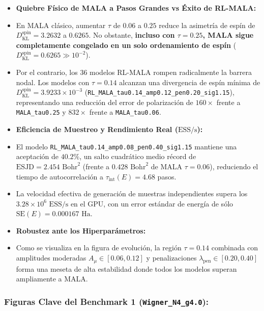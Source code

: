 \documentclass[10pt,a4paper]{article}
\begin{document}
\begin{itemize}
\item \textbf{Quiebre Físico de MALA a Pasos Grandes vs Éxito de RL-MALA:}
\item En MALA clásico, aumentar $\tau$ de $0.06$ a $0.25$ reduce la asimetría de espín de $D_{\mathrm{KL}}^{\mathrm{spin}} = 3.2632$ a $0.6265$. No obstante, \textbf{incluso con $\tau=0.25$, MALA sigue completamente congelado en un solo ordenamiento de espín} ($D_{\mathrm{KL}}^{\mathrm{spin}} = 0.6265 \gg 10^{-2}$).
\item Por el contrario, los 36 modelos RL-MALA rompen radicalmente la barrera nodal. Los modelos con $\tau=0.14$ alcanzan una divergencia de espín mínima de \textbf{$D_{\mathrm{KL}}^{\mathrm{spin}} = 3.9233 \times 10^{-3}$} (\texttt{RL\_MALA\_tau0.14\_amp0.12\_pen0.20\_sig1.15}), representando una reducción del error de polarización de \textbf{$160\times$} frente a \texttt{MALA\_tau0.25} y \textbf{$832\times$} frente a \texttt{MALA\_tau0.06}.
\item \textbf{Eficiencia de Muestreo y Rendimiento Real ($\mathrm{ESS/s}$):}
\item El modelo \texttt{RL\_MALA\_tau0.14\_amp0.08\_pen0.40\_sig1.15} mantiene una aceptación de \textbf{$40.2\%$}, un salto cuadrático medio récord de \textbf{$\mathrm{ESJD} = 2.454\text{ Bohr}^2$} (frente a $0.428\text{ Bohr}^2$ de MALA $\tau=0.06$), reduciendo el tiempo de autocorrelación a $\tau_{\mathrm{int}}(E) = 4.68$ pasos.
\item La velocidad efectiva de generación de muestras independientes supera los \textbf{$3.28 \times 10^6\text{ ESS/s}$} en el GPU, con un error estándar de energía de sólo $\mathrm{SE}(E) = 0.000167\text{ Ha}$.
\item \textbf{Robustez ante los Hiperparámetros:}
\item Como se visualiza en la figura de evolución, la región $\tau=0.14$ combinada con amplitudes moderadas $A_\mu \in [0.06, 0.12]$ y penalizaciones $\lambda_{\mathrm{pen}} \in [0.20, 0.40]$ forma una meseta de alta estabilidad donde todos los modelos superan ampliamente a MALA.
\end{itemize}




\subsubsection{Figuras Clave del Benchmark 1 (\texttt{Wigner\_N4\_g4.0}):}
\end{document}
